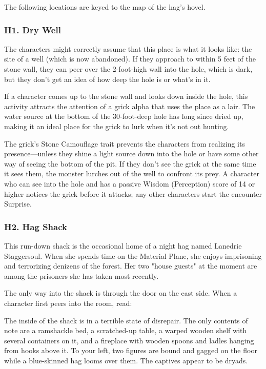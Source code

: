 \documentclass[10pt,a4paper,twoside,bg=print,twocolumn,openany,nodeprecatedcode]{dndbook}
\begin{document}
The following locations are keyed to the map of the hag's hovel.

\subsubsection{H1. Dry Well}
The characters might correctly assume that this place is what it looks like: the site of a well (which is now abandoned). If they approach to within 5 feet of the stone wall, they can peer over the 2-foot-high wall into the hole, which is dark, but they don't get an idea of how deep the hole is or what's in it.

If a character comes up to the stone wall and looks down inside the hole, this activity attracts the attention of a grick alpha that uses the place as a lair. The water source at the bottom of the 30-foot-deep hole has long since dried up, making it an ideal place for the grick to lurk when it's not out hunting.

The grick's Stone Camouflage trait prevents the characters from realizing its presence—unless they shine a light source down into the hole or have some other way of seeing the bottom of the pit. If they don't see the grick at the same time it sees them, the monster lurches out of the well to confront its prey. A character who can see into the hole and has a passive Wisdom (Perception) score of 14 or higher notices the grick before it attacks; any other characters start the encounter Surprise.

\subsubsection{H2. Hag Shack}
This run-down shack is the occasional home of a night hag named Lanedrie Staggersoul. When she spends time on the Material Plane, she enjoys imprisoning and terrorizing denizens of the forest. Her two "house guests" at the moment are among the prisoners she has taken most recently.

The only way into the shack is through the door on the east side. When a character first peers into the room, read:

\begin{DndReadAloud}{}
The inside of the shack is in a terrible state of disrepair. The only contents of note are a ramshackle bed, a scratched-up table, a warped wooden shelf with several containers on it, and a fireplace with wooden spoons and ladles hanging from hooks above it. To your left, two figures are bound and gagged on the floor while a blue-skinned hag looms over them. The captives appear to be dryads.

\end{DndReadAloud}
\end{document}

